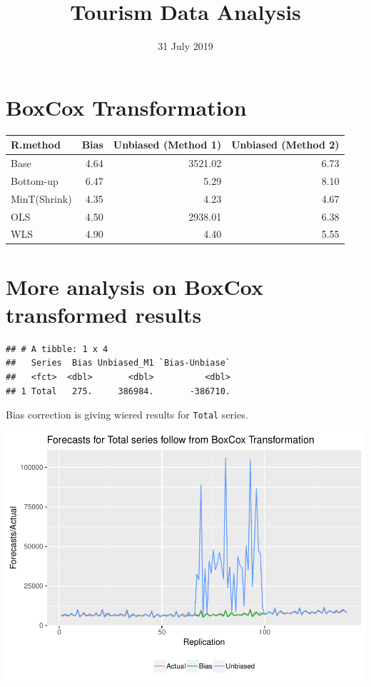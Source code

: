 \documentclass[]{article}
\title{Tourism Data Analysis}
\author{}
\date{31 July 2019}
\begin{document}
\maketitle

\section{BoxCox Transformation}\label{boxcox-transformation}

\begin{tabular}{l|r|r|r}
\hline
R.method & Bias & Unbiased (Method 1) & Unbiased (Method 2)\\
\hline
Base & 4.64 & 3521.02 & 6.73\\
\hline
Bottom-up & 6.47 & 5.29 & 8.10\\
\hline
MinT(Shrink) & 4.35 & 4.23 & 4.67\\
\hline
OLS & 4.50 & 2938.01 & 6.38\\
\hline
WLS & 4.90 & 4.40 & 5.55\\
\hline
\end{tabular}

\section{More analysis on BoxCox transformed
results}\label{more-analysis-on-boxcox-transformed-results}

\begin{verbatim}
## # A tibble: 1 x 4
##   Series  Bias Unbiased_M1 `Bias-Unbiase`
##   <fct>  <dbl>       <dbl>          <dbl>
## 1 Total   275.     386984.       -386710.
\end{verbatim}

Bias correction is giving wiered results for \texttt{Total} series.

\includegraphics{TourismData-Final-results_files/figure-latex/unnamed-chunk-3-1.pdf}
\end{document}

